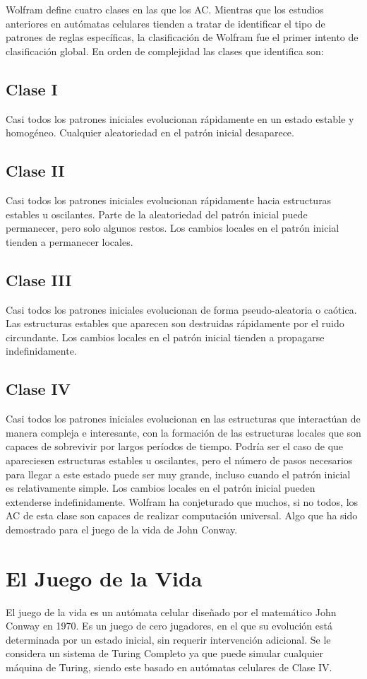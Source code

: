 \documentclass[10pt]{article}
\begin{document}
	Wolfram define cuatro clases en las que los AC. Mientras que los estudios anteriores en autómatas celulares tienden a tratar de identificar el tipo de patrones de reglas específicas, la clasificación de Wolfram fue el primer intento de clasificación global. En orden de complejidad las clases que identifica son:
		
		\subsection{Clase I}
		Casi todos los patrones iniciales evolucionan rápidamente en un estado estable y homogéneo. Cualquier aleatoriedad en el patrón inicial desaparece.
			
		\subsection{Clase II}
		Casi todos los patrones iniciales evolucionan rápidamente hacia estructuras estables u oscilantes. Parte de la aleatoriedad del patrón inicial puede permanecer, pero solo algunos restos. Los cambios locales en el patrón inicial tienden a permanecer locales.
			
		\subsection{Clase III} 
		Casi todos los patrones iniciales evolucionan de forma pseudo-aleatoria o caótica. Las estructuras estables que aparecen son destruidas rápidamente por el ruido circundante. Los cambios locales en el patrón inicial tienden a propagarse indefinidamente.
			
		\subsection{Clase IV}
		Casi todos los patrones iniciales evolucionan en las estructuras que interactúan de manera compleja e interesante, con la formación de las estructuras locales que son capaces de sobrevivir por largos períodos de tiempo. Podría ser el caso de que apareciesen estructuras estables u oscilantes, pero el número de pasos necesarios para llegar a este estado puede ser muy grande, incluso cuando el patrón inicial es relativamente simple. Los cambios locales en el patrón inicial pueden extenderse indefinidamente. Wolfram ha conjeturado que muchos, si no todos, los AC de esta clase son capaces de realizar computación universal. Algo que ha sido demostrado para el juego de la vida de John Conway.
    \section{El Juego de la Vida}
        El juego de la vida es un autómata celular diseñado por el matemático John Conway en 1970. Es un juego de cero jugadores, en el que su evolución está determinada por un estado inicial, sin requerir intervención adicional. Se le considera un sistema de Turing Completo ya que puede simular cualquier máquina de Turing, siendo este basado en autómatas celulares de Clase IV.
\end{document}
